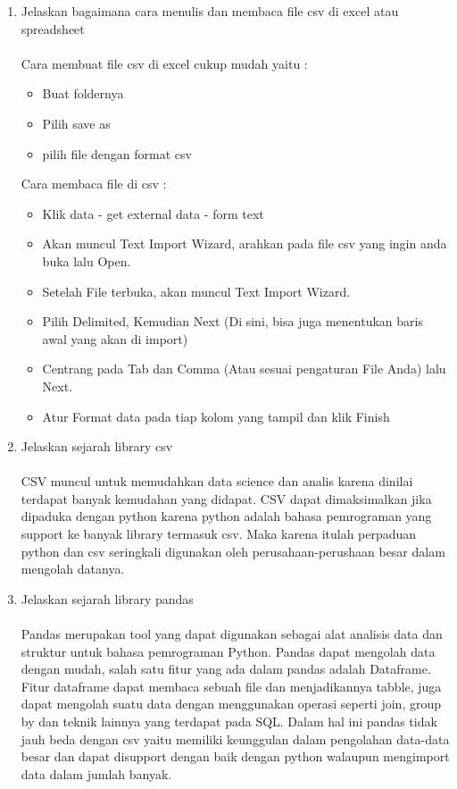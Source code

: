 \begin{enumerate}
\item Jelaskan bagaimana cara menulis dan membaca ﬁle csv di excel atau spreadsheet
\paragraph{} Cara membuat file csv di excel cukup mudah yaitu :
\begin{itemize}
	\item Buat foldernya
	\item Pilih save as
	\item pilih file dengan format csv
\end{itemize}
Cara membaca file di csv :
\begin{itemize}
	\item Klik data - get external data - form text
	\item Akan muncul Text Import Wizard, arahkan pada file csv yang ingin anda buka lalu Open.
	\item Setelah File terbuka, akan muncul Text Import Wizard.
	\item Pilih Delimited, Kemudian Next (Di sini, bisa juga menentukan baris awal yang akan di import)
	\item Centrang pada Tab dan Comma (Atau sesuai pengaturan File Anda) lalu Next.
	\item Atur Format data pada tiap kolom yang tampil dan klik Finish
\end{itemize}

\item Jelaskan sejarah library csv
\paragraph{} CSV muncul untuk memudahkan data science dan analis karena dinilai terdapat banyak kemudahan yang didapat. CSV dapat dimaksimalkan jika dipaduka dengan python karena python adalah bahasa pemrograman yang support ke banyak library termasuk csv. Maka karena itulah perpaduan python dan csv seringkali digunakan oleh perusahaan-perushaan besar dalam mengolah datanya.

\item Jelaskan sejarah library pandas
\paragraph{} Pandas merupakan tool yang dapat digunakan sebagai alat analisis data dan struktur untuk bahasa pemrograman Python. Pandas dapat mengolah data dengan mudah, salah satu fitur yang ada dalam pandas adalah Dataframe. Fitur dataframe dapat membaca sebuah file dan menjadikannya tabble, juga dapat mengolah suatu data dengan menggunakan operasi seperti join, group by dan teknik lainnya yang terdapat pada SQL. Dalam hal ini pandas tidak jauh beda dengan csv yaitu memiliki keunggulan dalam pengolahan data-data besar dan dapat disupport dengan baik dengan python walaupun mengimport data dalam jumlah banyak.


\end{enumerate}
